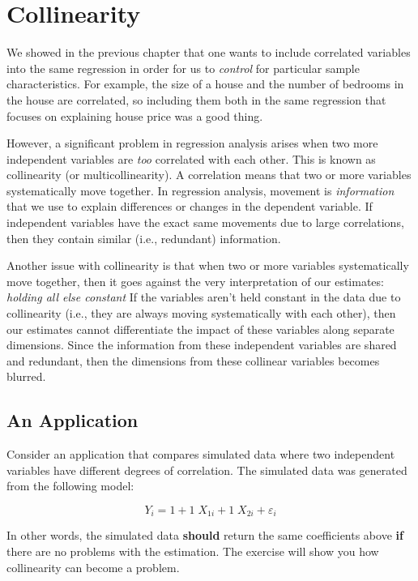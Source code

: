 \documentclass[
]{book}
\begin{document}
\hypertarget{COL}{%
\chapter{Collinearity}\label{COL}}

We showed in the previous chapter that one wants to include correlated variables into the same regression in order for us to \emph{control} for particular sample characteristics. For example, the size of a house and the number of bedrooms in the house are correlated, so including them both in the same regression that focuses on explaining house price was a good thing.

However, a significant problem in regression analysis arises when two more independent variables are \emph{too} correlated with each other. This is known as collinearity (or multicollinearity). A correlation means that two or more variables systematically move together. In regression analysis, movement is \emph{information} that we use to explain differences or changes in the dependent variable. If independent variables have the exact same movements due to large correlations, then they contain similar (i.e., redundant) information.

Another issue with collinearity is that when two or more variables systematically move together, then it goes against the very interpretation of our estimates: \emph{holding all else constant} If the variables aren't held constant in the data due to collinearity (i.e., they are always moving systematically with each other), then our estimates cannot differentiate the impact of these variables along separate dimensions. Since the information from these independent variables are shared and redundant, then the dimensions from these collinear variables becomes blurred.

\hypertarget{an-application-1}{%
\section{An Application}\label{an-application-1}}

Consider an application that compares simulated data where two independent variables have different degrees of correlation. The simulated data was generated from the following model:

\[Y_i = 1 + 1 \;X_{1i} + 1\; X_{2i} + \varepsilon_i\]

In other words, the simulated data \textbf{should} return the same coefficients above \textbf{if} there are no problems with the estimation. The exercise will show you how collinearity can become a problem.
\end{document}
